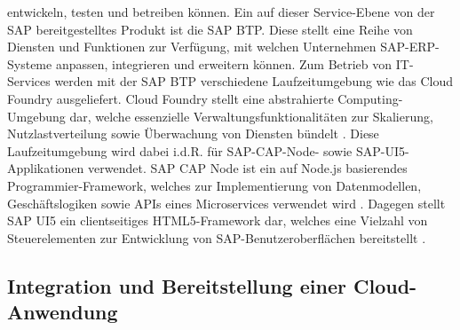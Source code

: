 entwickeln, testen und betreiben können. Ein auf dieser Service-Ebene von der SAP bereitgestelltes Produkt ist die \ac{SAP BTP}. Diese stellt eine Reihe von Diensten und Funktionen zur Verfügung, mit welchen Unternehmen SAP-ERP-Systeme anpassen, integrieren und erweitern können. Zum Betrieb von IT-Services werden mit der SAP BTP verschiedene Laufzeitumgebung wie das Cloud Foundry ausgeliefert. Cloud Foundry stellt eine abstrahierte Computing-Umgebung dar, welche essenzielle Verwaltungsfunktionalitäten zur Skalierung, Nutzlastverteilung sowie Überwachung von Diensten bündelt \cite{.20230429}. Diese Laufzeitumgebung wird dabei i.d.R. für SAP-CAP-Node- sowie SAP-UI5-Applikationen verwendet. SAP CAP Node ist ein auf Node.js basierendes Programmier-Framework, welches zur Implementierung von Datenmodellen, Geschäftslogiken sowie APIs eines Microservices verwendet wird \cite{Steckenborn.20210526}. Dagegen stellt SAP UI5 ein clientseitiges HTML5-Framework dar, welches eine Vielzahl von Steuerelementen zur Entwicklung von SAP-Benutzeroberflächen bereitstellt \cite{.20210609}. 

\subsection{Integration und Bereitstellung einer Cloud-Anwendung}
